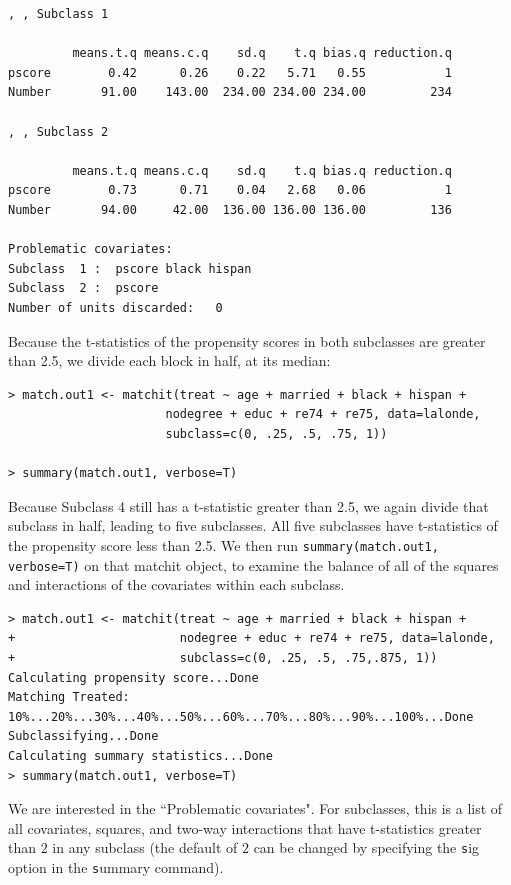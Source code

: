 \documentclass[oneside,letterpaper,titlepage]{article}
\begin{document}
\begin{verbatim}
, , Subclass 1

         means.t.q means.c.q    sd.q    t.q bias.q reduction.q
pscore        0.42      0.26    0.22   5.71   0.55           1
Number       91.00    143.00  234.00 234.00 234.00         234

, , Subclass 2

         means.t.q means.c.q    sd.q    t.q bias.q reduction.q
pscore        0.73      0.71    0.04   2.68   0.06           1
Number       94.00     42.00  136.00 136.00 136.00         136

Problematic covariates:
Subclass  1 :  pscore black hispan
Subclass  2 :  pscore
Number of units discarded:   0

\end{verbatim}

Because the t-statistics of the propensity scores in both subclasses
are greater than 2.5, we divide each block in half, at its median:

\begin{verbatim}
> match.out1 <- matchit(treat ~ age + married + black + hispan +
                      nodegree + educ + re74 + re75, data=lalonde,                      
                      subclass=c(0, .25, .5, .75, 1))

> summary(match.out1, verbose=T)
\end{verbatim}

Because Subclass 4 still has a t-statistic greater than 2.5, we again
divide that subclass in half, leading to five subclasses.  All five
subclasses have t-statistics of the propensity score less than 2.5.
We then run {\tt summary(match.out1, verbose=T)} on that matchit
object, to examine the balance of all of the squares and interactions
of the covariates within each subclass.

\begin{verbatim}
> match.out1 <- matchit(treat ~ age + married + black + hispan +
+                       nodegree + educ + re74 + re75, data=lalonde,
+                       subclass=c(0, .25, .5, .75,.875, 1))
Calculating propensity score...Done
Matching Treated: 10%...20%...30%...40%...50%...60%...70%...80%...90%...100%...Done
Subclassifying...Done
Calculating summary statistics...Done
> summary(match.out1, verbose=T)
\end{verbatim}

We are interested in the ``Problematic covariates".  For subclasses,
this is a list of all covariates, squares, and two-way interactions
that have t-statistics greater than $2$ in any subclass (the default
of $2$ can be changed by specifying the {\texttt sig} option in the
{\texttt summary} command).
\end{document}
